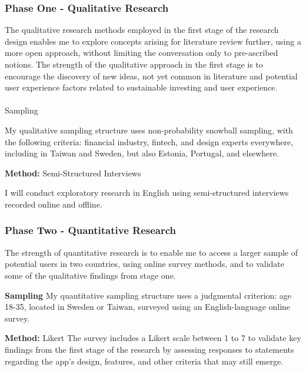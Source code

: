 \documentclass[
  letterpaper,
  DIV=11,
  numbers=noendperiod]{scrartcl}
\makeatletter
\let\oldparagraph\paragraph
\renewcommand{\paragraph}{
    \@ifstar
      \xxxParagraphStar
      \xxxParagraphNoStar
  }
\newcommand{\xxxParagraphStar}[1]{\oldparagraph*{#1}\mbox{}}
\newcommand{\xxxParagraphNoStar}[1]{\oldparagraph{#1}\mbox{}}
\makeatother
\begin{document}
\subsubsection{Phase One - Qualitative
Research}\label{phase-one---qualitative-research}

The qualitative research methods employed in the first stage of the
research design enables me to explore concepts arising for literature
review further, using a more open approach, without limiting the
conversation only to pre-ascribed notions. The strength of the
qualitative approach in the first stage is to encourage the discovery of
new ideas, not yet common in literature and potential user experience
factors related to sustainable investing and user experience.

\paragraph{Sampling}\label{sampling}

My qualitative sampling structure uses non-probability snowball
sampling, with the following criteria: financial industry, fintech, and
design experts everywhere, including in Taiwan and Sweden, but also
Estonia, Portugal, and elsewhere.

\textbf{Method:} Semi-Structured Interviews

I will conduct exploratory research in English using semi-structured
interviews recorded online and offline.

\subsubsection{Phase Two - Quantitative
Research}\label{phase-two---quantitative-research}

The strength of quantitative research is to enable me to access a larger
sample of potential users in two countries, using online survey methods,
and to validate some of the qualitative findings from stage one.

\textbf{Sampling} My quantitative sampling structure uses a judgmental
criterion: age 18-35, located in Sweden or Taiwan, surveyed using an
English-language online survey.

\textbf{Method:} Likert The survey includes a Likert scale between 1 to
7 to validate key findings from the first stage of the research by
assessing responses to statements regarding the app's design, features,
and other criteria that may still emerge.
\end{document}
